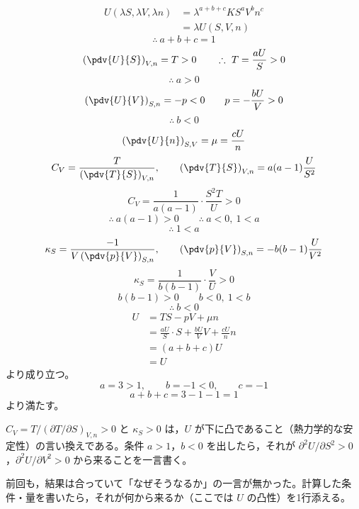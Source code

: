 \begin{align*}
U(\lambda S,\lambda V,\lambda n)&=\lambda^{a+b+c}KS^{a}V^{b}n^{c}\\
&=\lambda U(S,V,n)
\end{align*}
\[ \therefore\ a+b+c=1 \]
\[ \left(\pdv{U}{S}\right)_{V,n}=T>0 \qquad \therefore\ T=\frac{aU}{S}>0 \]
\[ \therefore\ a>0 \]
\[ \left(\pdv{U}{V}\right)_{S,n}=-p<0 \qquad p=-\frac{bU}{V}>0 \]
\[ \therefore\ b<0 \]
\[ \left(\pdv{U}{n}\right)_{S,V}=\mu=\frac{cU}{n} \]
\[ C_{V}=\frac{T}{\left(\pdv{T}{S}\right)_{V,n}}, \qquad \left(\pdv{T}{S}\right)_{V,n}=a(a-1)\frac{U}{S^{2}} \]
\[ C_{V}=\frac{1}{a(a-1)}\cdot\frac{S^{2}T}{U}>0 \]
\[ \therefore\ a(a-1)>0 \qquad \therefore\ a<0,\ 1<a \]
\[ \therefore\ 1<a \]
\[ \kappa_{S}=\frac{-1}{V\left(\pdv{p}{V}\right)_{S,n}}, \qquad \left(\pdv{p}{V}\right)_{S,n}=-b(b-1)\frac{U}{V^{2}} \]
\[ \kappa_{S}=\frac{1}{b(b-1)}\cdot\frac{V}{U}>0 \]
\[ b(b-1)>0 \qquad b<0,\ 1<b \]
\[ \therefore\ b<0 \]
\begin{align*}
U&=TS-pV+\mu n\\
&=\frac{aU}{S}\cdot S+\frac{bU}{V}V+\frac{cU}{n}n\\
&=(a+b+c)U\\
&=U
\end{align*}
より成り立つ。
\[ a=3>1, \qquad b=-1<0, \qquad c=-1 \]
\[ a+b+c=3-1-1=1 \]
より満たす。
\item $C_{V}=T/(\partial T/\partial S)_{V,n}>0$ と $\kappa_{S}>0$ は，$U$ が下に凸であること（熱力学的な安定性）の言い換えである。条件 $a>1$，$b<0$ を出したら，それが $\partial^{2}U/\partial S^{2}>0$，$\partial^{2}U/\partial V^{2}>0$ から来ることを一言書く。
\item {} 前回も，結果は合っていて「なぜそうなるか」の一言が無かった。計算した条件・量を書いたら，それが何から来るか（ここでは $U$ の凸性）を1行添える。
